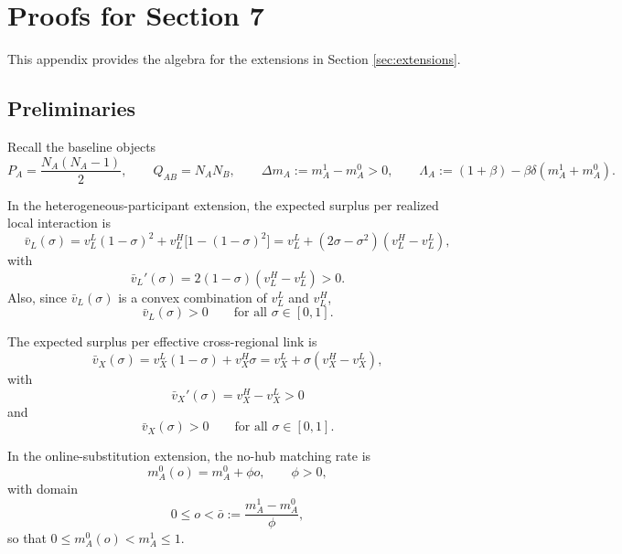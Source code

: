\section{Proofs for Section 7}

This appendix provides the algebra for the extensions in Section \ref{sec:extensions}.

\subsection{Preliminaries}

Recall the baseline objects
\[
P_A=\frac{N_A(N_A-1)}{2},
\qquad
Q_{AB}=N_AN_B,
\qquad
\Delta m_A:=m_A^1-m_A^0>0,
\qquad
\Lambda_A:=(1+\beta)-\beta\delta(m_A^1+m_A^0).
\]

In the heterogeneous-participant extension, the expected surplus per realized local interaction is
\begin{equation}
\bar v_L(\sigma)
=
v_L^L(1-\sigma)^2
+
v_L^H\bigl[1-(1-\sigma)^2\bigr]
=
v_L^L+(2\sigma-\sigma^2)(v_L^H-v_L^L),
\label{eq:app7_vbarL_sigma}
\end{equation}
with
\begin{equation}
\bar v_L'(\sigma)=2(1-\sigma)(v_L^H-v_L^L)>0.
\label{eq:app7_vbarL_prime}
\end{equation}
Also, since $\bar v_L(\sigma)$ is a convex combination of $v_L^L$ and $v_L^H$,
\begin{equation}
\bar v_L(\sigma)>0
\qquad
\text{for all }\sigma\in[0,1].
\label{eq:app7_vbarL_positive}
\end{equation}

The expected surplus per effective cross-regional link is
\begin{equation}
\bar v_X(\sigma)
=
v_X^L(1-\sigma)+v_X^H\sigma
=
v_X^L+\sigma(v_X^H-v_X^L),
\label{eq:app7_vbarX_sigma}
\end{equation}
with
\begin{equation}
\bar v_X'(\sigma)=v_X^H-v_X^L>0
\label{eq:app7_vbarX_prime}
\end{equation}
and
\begin{equation}
\bar v_X(\sigma)>0
\qquad
\text{for all }\sigma\in[0,1].
\label{eq:app7_vbarX_positive}
\end{equation}

In the online-substitution extension, the no-hub matching rate is
\begin{equation}
m_A^0(o)=m_A^0+\phi o,
\qquad
\phi>0,
\label{eq:app7_m0o}
\end{equation}
with domain
\begin{equation}
0\le o<\bar o:=\frac{m_A^1-m_A^0}{\phi},
\label{eq:app7_o_domain}
\end{equation}
so that $0\le m_A^0(o)<m_A^1\le 1$.

